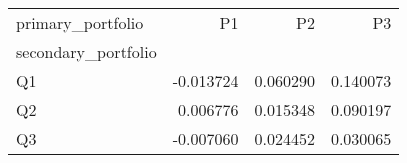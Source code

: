 \begin{tabular}{lrrr}
\toprule
primary_portfolio & P1 & P2 & P3 \\
secondary_portfolio &  &  &  \\
\midrule
Q1 & -0.013724 & 0.060290 & 0.140073 \\
Q2 & 0.006776 & 0.015348 & 0.090197 \\
Q3 & -0.007060 & 0.024452 & 0.030065 \\
\bottomrule
\end{tabular}
